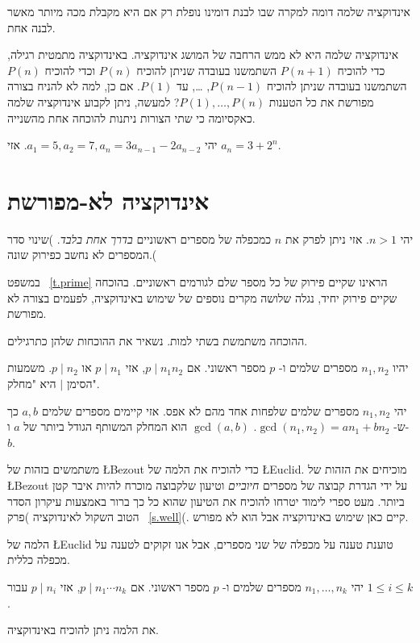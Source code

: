 אינדוקציה שלמה דומה למקרה שבו לבנת דומינו נופלת רק אם היא מקבלת מכה מיותר מאשר לבנה אחת.

אינדוקציה שלמה היא לא ממש הרחבה של המושג אינדוקציה. באינדוקציה מתמטית רגילה, כדי להוכיח
$P(n+1)$
השתמשנו בעובדה שניתן להוכיח
$P(n)$
וכדי להוכיח
$P(n)$
השתמשנו בעובדה שניתן להוכיח
$P(n-1)$, \ldots,
עד
$P(1)$.
אם כן, למה לא להניח בצורה מפורשת את כל הטענות
$P(1),\ldots,P(n)$?
למעשה, ניתן לקבוע אינדוקציה שלמה כאקסיומה כי שתי הצורות ניתנות להוכחה אחת מהשנייה.

\begin{exercise}
יהי
$a_1=5, a_2=7, a_n=3a_{n-1} - 2a_{n-2}$.
אזי
$a_n=3+2^n$.
\end{exercise}

\section{%
אינדוקציה לא-מפורשת%
}\label{s.unique}

\begin{theorem}
יהי
$n>1$.
אזי ניתן לפרק את
$n$
כמכפלה של מספרים ראשוניים
\emph{בדרך אחת בלבד}.
)שינוי סדר המספרים לא נחשב כפירוק שונה.(
\end{theorem}

במשפט~%
\ref{t.prime}
הראינו שקיים פירוק של כל מספר שלם לגורמים ראשוניים. בהוכחה שקיים פירוק יחיד, נגלה שלושה מקרים נוספים של שימוש באינדוקציה, לפעמים בצורה לא מפורשת.

ההוכחה משתמשת בשתי למות. נשאיר את ההוכחות שלהן כתרגילים.

\begin{lemma}
יהיו
$n_1,n_2$
מספרים שלמים
ו-%
$p$
מספר ראשוני. אם
$p \mid n_1 n_2$,
אזי
$p\mid n_1$ 
או
$p\mid n_2$.
משמעות הסימן
$|$
היא "מחלק".
\end{lemma}

\begin{lemma}
יהי
$n_1, n_2$
מספרים שלמים שלפחות אחד מהם לא אפס. אזי קיימים מספרים שלמים
$a,b$
כך ש-%
$\gcd(n_1,n_2)=an_1+bn_2$. $\gcd(a,b)$
הוא המחלק המשותף הגודל ביותר של
$a$
ו-%
$b$.
\end{lemma}

משתמשים בזהות של
\L{Bezout}
כדי להוכיח את הלמה של
\L{Euclid}.
מוכיחים את הזהות של
\L{Bezout}
על ידי הגדרת קבוצה של מספרים
\emph{חיוביים}
וטיעון שלקבוצה מוכרח להיות איבר קטן ביותר. מעט ספרי לימוד יטרחו להוכיח את הטיעון שהוא כל כך ברור באמצעות עיקרון הסדר הטוב השקול לאינדוקציה )פרק~%
\ref{s.well}(.
קיים כאן שימוש באינדוקציה אבל הוא לא מפורש.

הלמה של
\L{Euclid}
טוענת טענה על מכפלה של שני מספרים, אבל אנו זקוקים לטענה על מכפלה כללית.
\begin{lemma}
יהי
$n_1,\ldots,n_k$
מספרים שלמים ו-%
$p$
מספר ראשוני. אם
$p \mid n_1 \cdots n_k$,
אזי
$p\mid n_i$
עבור
$1\leq i \leq k$.
\end{lemma}
את הלמה ניתן להוכיח באינדוקציה.

